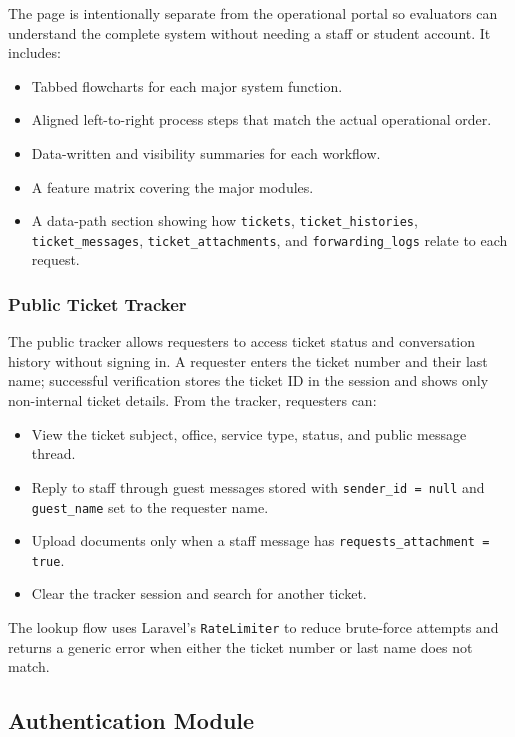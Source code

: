 \documentclass[12pt,a4paper]{article}
\newcommand{\code}[1]{\texttt{#1}}
\begin{document}
The page is intentionally separate from the operational portal so evaluators can understand the complete system without needing a staff or student account. It includes:

\begin{itemize}
    \item Tabbed flowcharts for each major system function.
    \item Aligned left-to-right process steps that match the actual operational order.
    \item Data-written and visibility summaries for each workflow.
    \item A feature matrix covering the major modules.
    \item A data-path section showing how \code{tickets}, \code{ticket\_histories}, \code{ticket\_messages}, \code{ticket\_attachments}, and \code{forwarding\_logs} relate to each request.
\end{itemize}

\subsubsection{Public Ticket Tracker}

The public tracker allows requesters to access ticket status and conversation history without signing in. A requester enters the ticket number and their last name; successful verification stores the ticket ID in the session and shows only non-internal ticket details. From the tracker, requesters can:

\begin{itemize}
    \item View the ticket subject, office, service type, status, and public message thread.
    \item Reply to staff through guest messages stored with \code{sender\_id = null} and \code{guest\_name} set to the requester name.
    \item Upload documents only when a staff message has \code{requests\_attachment = true}.
    \item Clear the tracker session and search for another ticket.
\end{itemize}

The lookup flow uses Laravel's \code{RateLimiter} to reduce brute-force attempts and returns a generic error when either the ticket number or last name does not match.

\subsection{Authentication Module}
\end{document}
